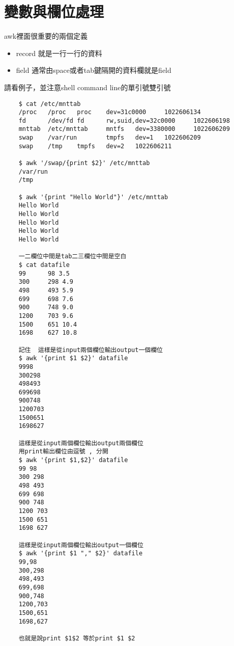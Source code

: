     \section{變數與欄位處理}
    awk裡面很重要的兩個定義
    \begin{itemize}
    \item record 就是一行一行的資料
    \item field  通常由space或者tab鍵隔開的資料欄就是field
    \end{itemize}
    請看例子，並注意shell command line的單引號雙引號
    \begin{verbatim}
    $ cat /etc/mnttab
    /proc   /proc   proc    dev=31c0000     1022606134
    fd      /dev/fd fd      rw,suid,dev=32c0000     1022606198
    mnttab  /etc/mnttab     mntfs   dev=3380000     1022606209
    swap    /var/run        tmpfs   dev=1   1022606209
    swap    /tmp    tmpfs   dev=2   1022606211

    $ awk '/swap/{print $2}' /etc/mnttab
    /var/run
    /tmp

    $ awk '{print "Hello World"}' /etc/mnttab
    Hello World
    Hello World
    Hello World
    Hello World
    Hello World

    一二欄位中間是tab二三欄位中間是空白
    $ cat datafile
    99		98 3.5
    300		298 4.9
    498		493 5.9
    699		698 7.6
    900		748 9.0
    1200	703 9.6
    1500	651 10.4
    1698	627 10.8

    記住  這樣是從input兩個欄位輸出output一個欄位
    $ awk '{print $1 $2}' datafile
    9998
    300298
    498493
    699698
    900748
    1200703
    1500651
    1698627

    這樣是從input兩個欄位輸出output兩個欄位
    用print輸出欄位由逗號 , 分開
    $ awk '{print $1,$2}' datafile
    99 98
    300 298
    498 493
    699 698
    900 748
    1200 703
    1500 651
    1698 627

    這樣是從input兩個欄位輸出output一個欄位
    $ awk '{print $1 "," $2}' datafile
    99,98
    300,298
    498,493
    699,698
    900,748
    1200,703
    1500,651
    1698,627

    也就是說print $1$2 等於print $1 $2

    \end{verbatim}
